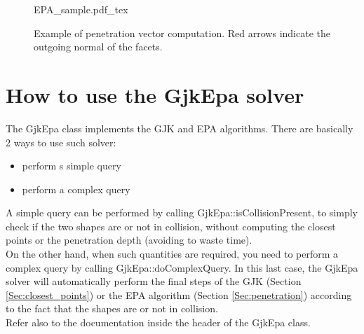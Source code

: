 \documentclass{article}
\begin{document}
\begin{figure}
	\centering
\def\svgwidth{0.9 \columnwidth}
{EPA_sample.pdf_tex} 
	\caption{Example of penetration vector computation. Red arrows indicate the outgoing normal of the facets. }
	\label{fig:EPA_sample}
\end{figure}

\section{How to use the GjkEpa solver}

The GjkEpa class implements the GJK and EPA algorithms.
There are basically 2 ways to use such solver:
\begin{itemize}
\item perform s simple query
\item perform a complex query
\end{itemize}
A simple query can be performed by calling GjkEpa::isCollisionPresent, to simply check if the two shapes are or not in collision, without computing the closest points or the penetration depth (avoiding to waste time).
\\
On the other hand, when such quantities are required, you need to perform a complex query by calling GjkEpa::doComplexQuery.
In this last case, the GjkEpa solver will automatically perform the final steps of the GJK (Section \ref{Sec:closest_points}) or the EPA algorithm (Section \ref{Sec:penetration}) according to the fact that the shapes are or not in collision.
\\
Refer also to the documentation inside the header of the GjkEpa class.
\end{document}
